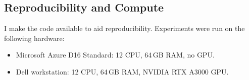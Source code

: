 \documentclass[11pt]{article}
\begin{document}
\subsection{Reproducibility and Compute}
I make the code available to aid reproducibility. Experiments were run on the following hardware:
\begin{itemize}
  \item Microsoft Azure D16 Standard: 12 CPU, 64\,GB RAM, no GPU.
  \item Dell workstation: 12 CPU, 64\,GB RAM, NVIDIA RTX A3000 GPU.
\end{itemize}
\end{document}
